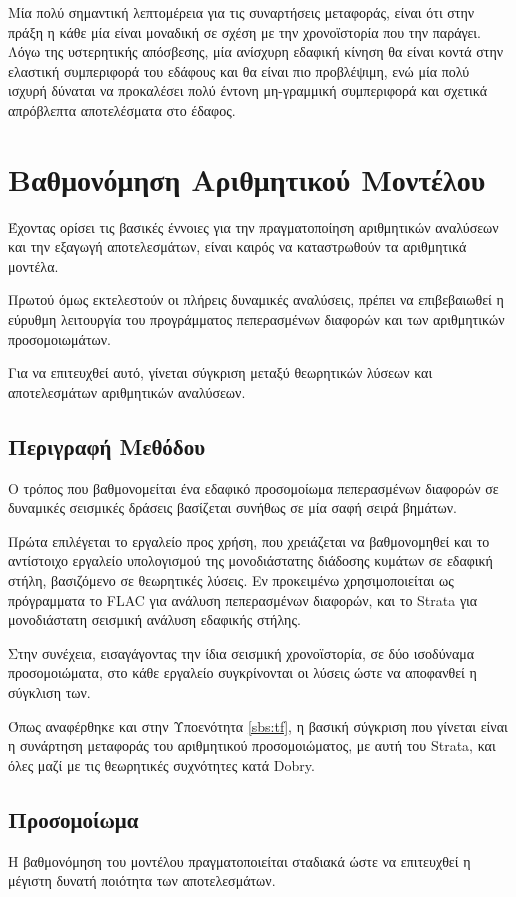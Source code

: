Μία πολύ σημαντική λεπτομέρεια για τις συναρτήσεις μεταφοράς, είναι ότι στην πράξη η κάθε μία είναι μοναδική σε σχέση με την χρονοϊστορία που την παράγει. Λόγω της υστερητικής απόσβεσης, μία ανίσχυρη εδαφική κίνηση θα είναι κοντά στην ελαστική συμπεριφορά του εδάφους και θα είναι πιο προβλέψιμη, ενώ μία πολύ ισχυρή δύναται να προκαλέσει πολύ έντονη μη-γραμμική συμπεριφορά και σχετικά απρόβλεπτα αποτελέσματα στο έδαφος.

\section{Βαθμονόμηση Αριθμητικού Μοντέλου}

Έχοντας ορίσει τις βασικές έννοιες για την πραγματοποίηση αριθμητικών αναλύσεων και την εξαγωγή αποτελεσμάτων, είναι καιρός να καταστρωθούν τα αριθμητικά μοντέλα.

Πρωτού όμως εκτελεστούν οι πλήρεις δυναμικές αναλύσεις, πρέπει να επιβεβαιωθεί η εύρυθμη λειτουργία του προγράμματος πεπερασμένων διαφορών και των αριθμητικών προσομοιωμάτων.

Για να επιτευχθεί αυτό, γίνεται σύγκριση μεταξύ θεωρητικών λύσεων και αποτελεσμάτων αριθμητικών αναλύσεων.

\subsection{Περιγραφή Μεθόδου}
Ο τρόπος που βαθμονομείται ένα εδαφικό προσομοίωμα πεπερασμένων διαφορών σε δυναμικές σεισμικές δράσεις βασίζεται συνήθως σε μία σαφή σειρά βημάτων.

Πρώτα επιλέγεται το εργαλείο προς χρήση, που χρειάζεται να βαθμονομηθεί και το αντίστοιχο εργαλείο υπολογισμού της μονοδιάστατης διάδοσης κυμάτων σε εδαφική στήλη, βασιζόμενο σε θεωρητικές λύσεις. Εν προκειμένω χρησιμοποιείται ως πρόγραμματα το FLAC για ανάλυση πεπερασμένων διαφορών, και το Strata για μονοδιάστατη σεισμική ανάλυση εδαφικής στήλης.

Στην συνέχεια, εισαγάγοντας την ίδια σεισμική χρονοϊστορία, σε δύο ισοδύναμα προσομοιώματα, στο κάθε εργαλείο συγκρίνονται οι λύσεις ώστε να αποφανθεί η σύγκλιση των.

Όπως αναφέρθηκε και στην Υποενότητα \ref{sbs:tf}, η βασική σύγκριση που γίνεται είναι η συνάρτηση μεταφοράς του αριθμητικού προσομοιώματος, με αυτή του Strata, και όλες μαζί με τις θεωρητικές συχνότητες κατά Dobry.

\subsection{Προσομοίωμα}
Η βαθμονόμηση του μοντέλου πραγματοποιείται σταδιακά ώστε να επιτευχθεί η μέγιστη δυνατή ποιότητα των αποτελεσμάτων.

